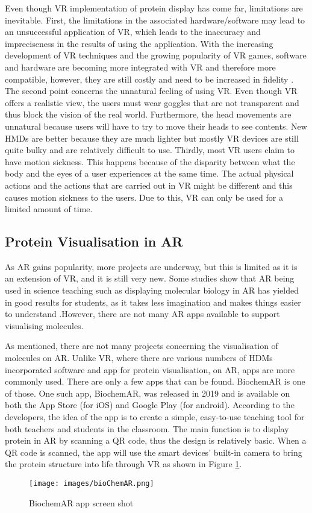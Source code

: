 Even though VR implementation of protein display has come far, limitations are inevitable. First, the limitations in the associated hardware/software may lead to an unsuccessful application of VR, which leads to the inaccuracy and impreciseness in the results of using the application. With the increasing development of VR techniques and the growing popularity of VR games, software and hardware are becoming more integrated with VR and therefore more compatible, however, they are still costly and need to be increased in fidelity \parencite{liu_using_2018}.
The second point concerns the unnatural feeling of using VR. Even though VR offers a realistic view, the users must wear goggles that are not transparent and thus block the vision of the real world. Furthermore, the head movements are unnatural because users will have to try to move their heads to see contents. New HMDs are better because they are much lighter but mostly VR devices are still quite bulky and are relatively difficult to use. Thirdly, most VR users claim to have motion sickness. This happens because of the disparity between what the body and the eyes of a user experiences at the same time. The actual physical actions and the actions that are carried out in VR might be different and this causes motion sickness to the users. Due to this, VR can only be used for a limited amount of time.


\subsection{Protein Visualisation in AR}

As AR gains popularity, more projects are underway, but this is limited as it is an extension of VR, and it is still very new. Some studies show that AR being used in science teaching such as displaying molecular biology in AR has yielded in good results for students, as it takes less imagination and makes things easier to understand \parencite{cai_case_2014}.However, there are not many AR apps available to support visualising molecules. 

As mentioned, there are not many projects concerning the visualisation of molecules on AR. Unlike VR, where there are various numbers of HDMs incorporated software and app for protein visualisation, on AR, apps are more commonly used. There are only a few apps that can be found. BiochemAR is one of those. One such app, BiochemAR, was released in 2019 and is available on both the App Store (for iOS) and Google Play (for android). According to the developers, the idea of the app is to create a simple, easy-to-use teaching tool for both teachers and students in the classroom\parencite{sung_biochemar_2020}. The main function is to display protein in AR by scanning a QR code, thus the design is relatively basic. When a QR code is scanned, the app will use the smart devices’ built-in camera to bring the protein structure into life through VR as shown in Figure \ref{fig:bioChemAR}.
\begin{figure}[!htbp]
	\centering
	\texttt{[image: images/bioChemAR.png]}
	\caption{BiochemAR app screen shot}
	\label{fig:bioChemAR}
\end{figure}

